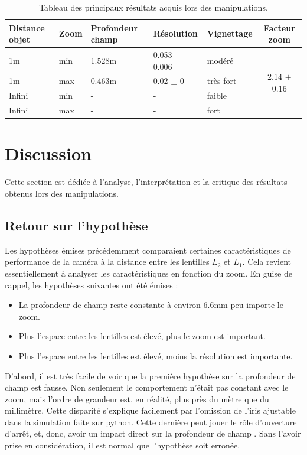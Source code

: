 \documentclass[11pt,letterpaper]{article}
\begin{document}
\begin{table}[h]
\centering
\begin{tabular}{|l|l||l|l|l||c|}
\hline
\textbf{Distance objet} & \textbf{Zoom} & \textbf{Profondeur champ} & \textbf{Résolution} & \textbf{Vignettage} & \textbf{Facteur zoom} \\ \hline
1m & min  & 1.528m & 0.053 $\pm$ 0.006 & modéré & \multirow{4}{*}{2.14 $\pm$ 0.16} \\ \cline{1-5}
1m & max  & 0.463m & 0.02 $\pm $ 0 & très fort & \\ \cline{1-5}
Infini & min  & - & - & faible & \\ \cline{1-5}
Infini & max  & - & - & fort & \\ \hline
\end{tabular}
\caption{Tableau des principaux résultats acquis lors des manipulations.}
\end{table}


\section{Discussion}

Cette section est dédiée à l'analyse, l'interprétation et la critique des résultats
obtenus lors des manipulations.

\subsection{Retour sur l'hypothèse}

Les hypothèses émises précédemment comparaient certaines caractéristiques de performance
de la caméra à la distance entre les lentilles $L_2$ et $L_1$. Cela revient 
essentiellement à analyser les caractéristiques en fonction du zoom. En guise de rappel,
les hypothèses suivantes ont été émises :

\begin{itemize}
\item La profondeur de champ reste constante à environ 6.6mm peu importe le zoom.
\item Plus l'espace entre les lentilles est élevé, plus le zoom est important.
\item Plus l'espace entre les lentilles est élevé, moins la résolution est importante.
\end{itemize}

D'abord, il est très facile de voir que la première hypothèse sur la profondeur
de champ est fausse. Non seulement le comportement n'était pas constant avec le zoom,
mais l'ordre de grandeur est, en réalité, plus près du mètre que du millimètre. Cette
disparité s'explique facilement par l'omission de l'iris ajustable dans la simulation
faite sur python. Cette dernière peut jouer le rôle d'ouverture d'arrêt, et, donc, avoir
un impact direct sur la profondeur de champ \cite{leblond_semaine_2024}. Sans l'avoir 
prise en considération, il est normal que l'hypothèse soit erronée.
\end{document}
